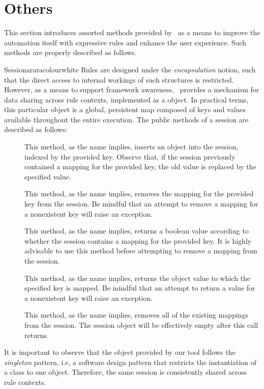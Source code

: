 \section{Others}
\label{sec:others}

This section introduces assorted methods provided by \arara\ as a means to improve the automation itself with expressive rules and enhance the user experience. Such methods are properly described as follows.

\begin{messagebox}{Session}{araracolour}{\icok}{white}
Rules are designed under the \emph{encapsulation} notion, such that the direct access to internal workings of such structures is restricted. However, as a means to support framework awareness, \arara\ provides a mechanism for data sharing across rule contexts, implemented as a  object. In practical terms, this particular object is a global, persistent map composed of  keys and  values available throughout the entire execution. The public methods of a session are described as follows:

\begin{description}
\item[\hfill{}] This method, as the name implies, inserts an object into the session, indexed by the provided key. Observe that, if the session previously contained a mapping for the provided key, the old value is replaced by the specified value.

\item[\hfill{}] This method, as the name implies, removes  the mapping for the provided key from the session. Be mindful that an attempt to remove a mapping for a nonexistent key will raise an exception.

\item[\hfill{}] This method, as the name implies, returns a boolean value according to whether the session contains a mapping for the provided key. It is highly advisable to use this method before attempting to remove a mapping from the session.

\item[\hfill{}] This method, as the name implies, returns the object value to which the specified key is mapped. Be mindful that an attempt to return a value for a nonexistent key will raise an exception.

\item[\hfill{}] This method, as the name implies, removes all of the existing mappings from the session. The session object will be effectively empty after this call returns.
\end{description}

It is important to observe that the  object provided by our tool follows the \emph{singleton} pattern, i.e, a software design pattern that restricts the instantiation of a class to one object. Therefore, the same session is consistently shared across rule contexts.
\end{messagebox}

